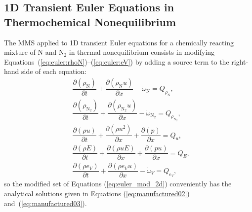 \documentclass[10pt]{article}
\newcommand{\Diff}[2] {\dfrac{\partial( #1)}{\partial #2}}
\begin{document}

\subsection{1D Transient Euler Equations in Thermochemical Nonequilibrium}

The MMS applied to 1D transient Euler equations for a chemically reacting mixture of  N and N$_{2}$ in thermal nonequilibrium consists in modifying  Equations~(\ref{eq:euler:rhoN})--(\ref{eq:euler:eV}) by adding a source term to the right-hand side of each equation:
\begin{equation}
 \label{eq:euler_mod_2d}
\begin{split}
&\Diff{\rho_{\text{N}}}{t}+\Diff{\rho_{\text{N}} u}{x} -\dot{\omega}_{\text{N}}= Q_{\rho_{\text{N}}},\\
&\Diff{\rho_{\text{N}_2}}{t}+\Diff{\rho_{\text{N}_2} u}{x} -\dot{\omega}_{\text{N}_2}= Q_{\rho_{\text{N}_2}},\\
&\Diff{\rho u}{t}+\Diff{\rho u^2 }{x}+ \Diff{p}{x} = Q_u,\\
&\Diff{\rho E}{t}+\Diff{\rho uE}{x}+ \Diff{pu}{x} = Q_{E},\\
&\Diff{\rho e_V }{t} + \Diff{\rho e_V u }{x}-\dot{\omega}_V =Q_{e_V},
\end{split}
\end{equation}
%
so the modified set of Equations (\ref{eq:euler_mod_2d}) conveniently has the analytical solutions given in Equations (\ref{eq:manufactured02}) and~(\ref{eq:manufactured03}).
%
\end{document}
